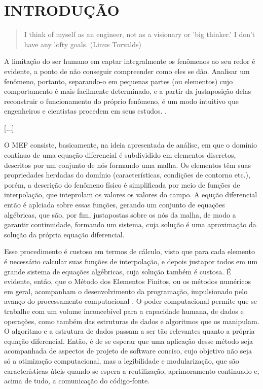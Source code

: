 

\chapter{INTRODUÇÃO}

\begin{quote}
    I think of myself as an engineer, not as a visionary or 'big thinker.' I don't have any lofty goals.
    (Linus Torvalds)  
\end{quote}

A limitação do ser humano em captar integralmente os fenômenos ao seu redor é evidente, a ponto de não conseguir compreender como eles se dão. Analisar um fenômeno, portanto, separando-o em pequenas partes (ou elementos) cujo comportamento é mais facilmente determinado, e a partir da justaposição delas reconstruir o funcionamento do próprio fenômeno, é um modo intuitivo que engenheiros e cientistas procedem em seus estudos. \cite[p. 2]{Zin}.

[...]

O MEF consiste, basicamente, na ideia apresentada de análise, em que o domínio contínuo de uma equação diferencial é subdividido em elementos discretos, descritos por um conjunto de nós formando uma malha. Os elementos têm suas propriedades herdadas do domínio (características, condições de contorno etc.), porém, a descrição do fenômeno físico é simplificada por meio de funções de interpolação, que inteprolam os valores os valores do campo. A equção diferencial então é aplciada sobre essas funções, gerando um conjunto de equações algébricas, que são, por fim, justapostas sobre os nós da malha, de modo a garantir continuidade, formando um sistema, cuja solução é uma aproximação da solução da própria equação diferencial. \cite[pág. 1 e 2]{LIU}

Esse procedimento é custoso em termos de cálculo, visto que para cada elemento é necessário calcular suas funções de interpolação, e depois justapor todos em um grande sistema de equações algébricas, cuja solução também é custosa. É evidente, então, que o Método dos Elementos Finitos, ou os métodos numéricos em geral, acompanham o desenvolvimento da programação, impulsionado pelo avanço do processamento computacional \cite[pág. 2]{Onate}. O poder computacional permite que se trabalhe com um volume inconcebível para a capacidade humana, de dados e operações, como também das estruturas de dados e algoritmos que os manipulam. O algoritmo e a estrutura de dados passam a ser tão relevantes quanto a própria equação diferencial. Então, é de se esperar que uma aplicação desse método seja acompanhada de aspectos de projeto de software conciso, cujo objetivo não seja só a otimização computacional, mas a legibilidade e modularização, que são características úteis quando se espera a reutilização, aprimoramento continuado e, acima de tudo, a comunicação do código-fonte.

